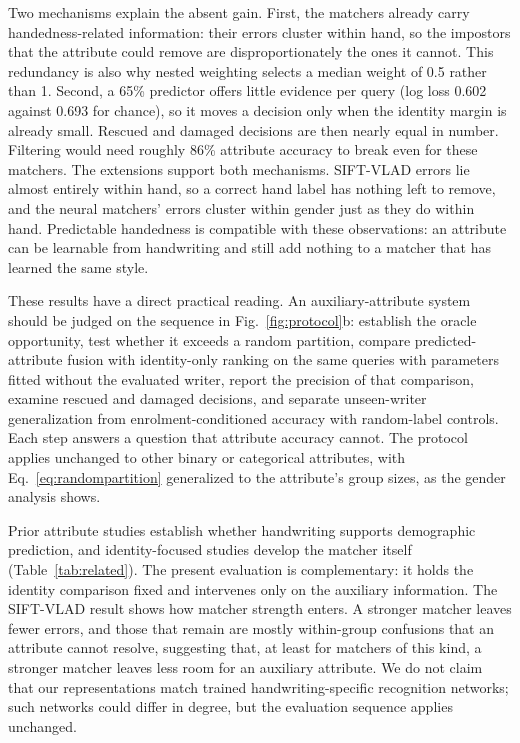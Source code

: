 Two mechanisms explain the absent gain. First, the matchers already carry handedness-related information: their errors cluster within hand, so the impostors that the attribute could remove are disproportionately the ones it cannot. This redundancy is also why nested weighting selects a median weight of 0.5 rather than 1. Second, a 65\% predictor offers little evidence per query (log loss 0.602 against 0.693 for chance), so it moves a decision only when the identity margin is already small. Rescued and damaged decisions are then nearly equal in number. Filtering would need roughly 86\% attribute accuracy to break even for these matchers. The extensions support both mechanisms. SIFT-VLAD errors lie almost entirely within hand, so a correct hand label has nothing left to remove, and the neural matchers' errors cluster within gender just as they do within hand. Predictable handedness \cite{prappo2026handedness} is compatible with these observations: an attribute can be learnable from handwriting and still add nothing to a matcher that has learned the same style.

These results have a direct practical reading. An auxiliary-attribute system should be judged on the sequence in Fig.~\ref{fig:protocol}b: establish the oracle opportunity, test whether it exceeds a random partition, compare predicted-attribute fusion with identity-only ranking on the same queries with parameters fitted without the evaluated writer, report the precision of that comparison, examine rescued and damaged decisions, and separate unseen-writer generalization from enrolment-conditioned accuracy with random-label controls. Each step answers a question that attribute accuracy cannot. The protocol applies unchanged to other binary or categorical attributes, with Eq.~\eqref{eq:randompartition} generalized to the attribute's group sizes, as the gender analysis shows.

Prior attribute studies establish whether handwriting supports demographic prediction, and identity-focused studies develop the matcher itself (Table~\ref{tab:related}). The present evaluation is complementary: it holds the identity comparison fixed and intervenes only on the auxiliary information. The SIFT-VLAD result shows how matcher strength enters. A stronger matcher leaves fewer errors, and those that remain are mostly within-group confusions that an attribute cannot resolve, suggesting that, at least for matchers of this kind, a stronger matcher leaves less room for an auxiliary attribute. We do not claim that our representations match trained handwriting-specific recognition networks; such networks could differ in degree, but the evaluation sequence applies unchanged.

